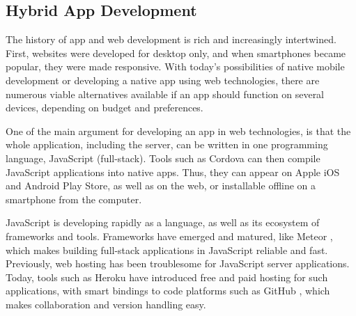 \subsection{Hybrid App Development}

The history of app and web development is rich and increasingly intertwined. First, websites were developed for desktop only, and when smartphones became popular, they were made responsive. With today's possibilities of native mobile development or developing a native app using web technologies, there are numerous viable alternatives available if an app should function on several devices, depending on budget and preferences.

One of the main argument for developing an app in web technologies, is that the whole application, including the server, can be written in one programming language, JavaScript (full-stack). Tools such as Cordova \citep*{cordova} can then compile JavaScript applications into native apps. Thus, they can appear on Apple iOS and Android Play Store, as well as on the web, or installable offline on a smartphone from the computer.

JavaScript is developing rapidly as a language, as well as its ecosystem of frameworks and tools. Frameworks have emerged and matured, like Meteor \citep*{meteor}, which makes building full-stack applications in JavaScript reliable and fast. Previously, web hosting has been troublesome for JavaScript server applications. Today, tools such as Heroku \citep*{heroku} have introduced free and paid hosting for such applications, with smart bindings to code platforms such as GitHub \citep*{github}, which makes collaboration and version handling easy.
